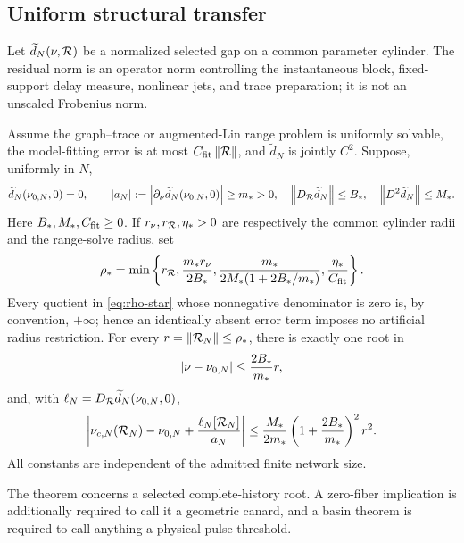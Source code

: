 \subsection{Uniform structural transfer}

Let \(\widetilde d_N(\nu,\mathcal R)\) be a normalized selected gap on a common
parameter cylinder.  The residual norm is an operator norm controlling the
instantaneous block, fixed-support delay measure, nonlinear jets, and trace
preparation; it is not an unscaled Frobenius norm.

\begin{theorem}\label{thm:one-gap}
Assume the graph--trace or augmented-Lin range problem is uniformly solvable,
the model-fitting error is at most \(C_{\rm fit}\left\lVert\mathcal R\right\rVert\), and
\(\widetilde d_N\) is jointly \(C^2\).  Suppose, uniformly in \(N\),
\begin{equation}
 \widetilde d_N(\nu_{0,N},0)=0,\qquad
 \left\lvert a_N\right\rvert:=\left\lvert\partial_\nu\widetilde d_N(\nu_{0,N},0)\right\rvert\ge m_*>0,
 \quad \left\lVert D_{\mathcal R}\widetilde d_N\right\rVert\le B_*,
 \quad \left\lVert D^2\widetilde d_N\right\rVert\le M_*.               \label{eq:root-bounds}
\end{equation}
Here \(B_*,M_*,C_{\rm fit}\ge0\).  If
\(r_\nu,r_{\mathcal R},\eta_*>0\) are respectively the common cylinder radii and
the range-solve radius, set
\begin{equation}
 \rho_*=\min\left\{r_{\mathcal R},\frac{m_*r_\nu}{2B_*},
 \frac{m_*}{2M_*(1+2B_*/m_*)},
 \frac{\eta_*}{C_{\rm fit}}\right\}.                   \label{eq:rho-star}
\end{equation}
Every quotient in \cref{eq:rho-star} whose nonnegative denominator is zero
is, by convention, \(+\infty\); hence an identically absent error term
imposes no artificial radius restriction.
For every \(r=\left\lVert\mathcal R_N\right\rVert\le\rho_*\), there is exactly one root in
\begin{equation}
 \left\lvert\nu-\nu_{0,N}\right\rvert\le\frac{2B_*}{m_*}r,              \label{eq:root-ball}
\end{equation}
and, with \(\ell_N=D_{\mathcal R}\widetilde d_N(\nu_{0,N},0)\),
\begin{equation}
 \left|\nu_{c,N}(\mathcal R_N)-\nu_{0,N}
       +\frac{\ell_N[\mathcal R_N]}{a_N}\right|
 \le\frac{M_*}{2m_*}\left(1+\frac{2B_*}{m_*}\right)^2r^2. \label{eq:root-remainder}
\end{equation}
All constants are independent of the admitted finite network size.
\end{theorem}

The theorem concerns a selected complete-history root.  A zero-fiber
implication is additionally required to call it a geometric canard, and a
basin theorem is required to call anything a physical pulse threshold.

